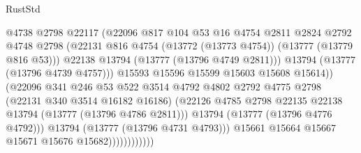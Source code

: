 \begin{lexlean}{RustStd}
\begin{coremodule}
                                    @4738
                                    @2798
                                    @22117
                                    (@22096
                                      @817
                                      @104
                                      @53
                                      @16
                                      @4754
                                      @2811
                                      @2824
                                      @2792
                                      @4748
                                      @2798
                                      (@22131
                                        @816
                                        @4754
                                        (@13772 (@13773 @4754))
                                        (@13777 (@13779 @816 @53)))
                                      @22138
                                      @13794
                                      (@13777 (@13796 @4749 @2811)))
                                    @13794
                                    (@13777 (@13796 @4739 @4757)))
                                  @15593
                                  @15596
                                  @15599
                                  @15603
                                  @15608
                                  @15614))
                              (@22096
                                @341
                                @246
                                @53
                                @522
                                @3514
                                @4792
                                @4802
                                @2792
                                @4775
                                @2798
                                (@22131 @340 @3514 @16182 @16186)
                                (@22126
                                  @4785
                                  @2798
                                  @22135
                                  @22138
                                  @13794
                                  (@13777 (@13796 @4786 @2811)))
                                @13794
                                (@13777 (@13796 @4776 @4792)))
                              @13794
                              (@13777 (@13796 @4731 @4793)))
                            @15661
                            @15664
                            @15667
                            @15671
                            @15676
                            @15682))))))))))))

\end{coremodule}
\end{lexlean}
